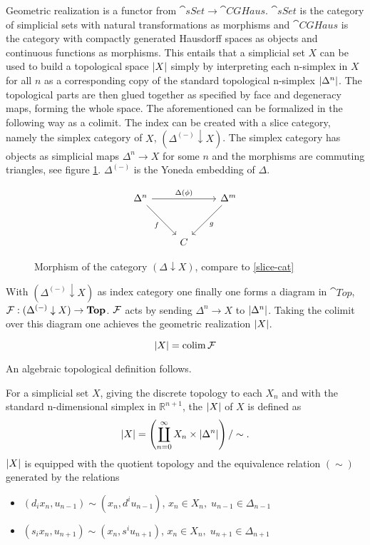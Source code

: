 \documentclass[../../main.tex]{subfiles}
\begin{document}
    Geometric realization is a functor from $\cat{sSet}\to \cat{CGHaus}$. $\cat{sSet}$ is the category of simplicial sets with natural transformations as morphisms and $\cat{CGHaus}$ is the category with compactly generated Hausdorff spaces as objects and continuous functions as morphisms. This entails that a simplicial set $X$ can be used to build a topological space $\geom[X]$ simply by interpreting each n-simplex in $X$ for all $n$ as a corresponding copy of the standard topological n-simplex $\geom[\Delta^n]$. The topological parts are then glued together as specified by face and degeneracy maps, forming the whole space. The aforementioned can be formalized in the following way as a colimit. The index can be created with a slice category, namely the simplex category of $X$, $(\Delta^{(-)} \downarrow X)$. The simplex category has objects as simplicial maps $\Delta^n\to X$ for some $n$ and the morphisms are commuting triangles, see figure \ref{commuting-tri}. $\Delta^{(-)}$ is the Yoneda embedding of $\Delta$. 
    
    \begin{figure}[H]
        \[
            \begin{tikzcd}[row sep = 3em]
                \Delta^n \arrow[rr,"\Delta(\phi)"] \arrow[dr, "f", swap] && \Delta^m \arrow[dl,"g"] \\
                & C
            \end{tikzcd}
        \]
        \caption{Morphism of the category $(\Delta \downarrow X)$, compare to \ref{slice-cat}}
        \label{commuting-tri}
    \end{figure}
    
    With $(\Delta^{(-)} \downarrow X)$ as index category one finally one forms a diagram in $\cat{Top}$, $\functor{F}:(\Delta^{(-)} \downarrow X) \to \cat{Top}$. $\functor{F}$ acts by sending $\Delta^n \to X$ to $\geom[\Delta^n]$. Taking the colimit over this diagram one achieves the geometric realization $\geom[X]$\cite{luk-simp}.
    
    \[\geom[X]= \mathrm{colim}\, \functor{F}\]

    An algebraic topological definition follows.

    \begin{definition}
        For a simplicial set $X$, giving the discrete topology to each $X_n$ and with the standard n-dimensional simplex in $\mathbb{R}^{n+1}$, the  $\geom[X]$ of $X$ is defined as
        \[\geom[X]=\left(\coprod_{n=0}^{\infty} X_n \times \geom[\Delta^n]\right)/\sim.\]
        $\geom[X]$ is equipped with the quotient topology and the equivalence relation $(\sim)$ generated by the relations 
        \begin{itemize}
            \item $(d_ix_{n},u_{n-1})\sim(x_{n}, d^iu_{n-1})$, $x_n\in X_n,\; u_{n-1} \in \Delta _{n-1}$
            \item $(s_ix_n, u_{n+1})\sim(x_n, s^iu_{n+1})$, $x_n \in X_n,\; u_{n+1}\in \Delta_{n+1}$
        \end{itemize}\label{geo-rel}
    \end{definition}
\end{document}
